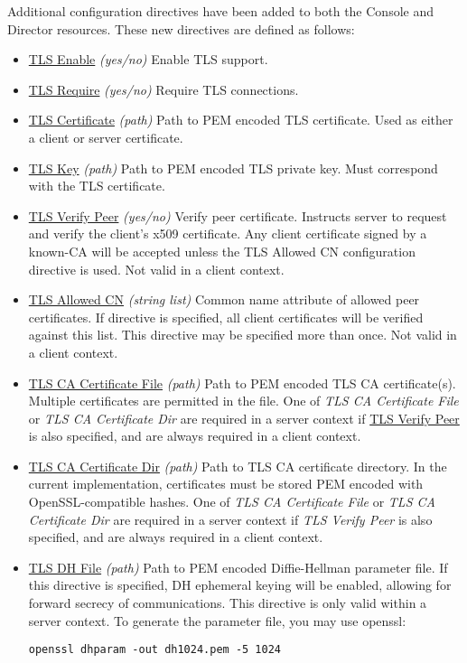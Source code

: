Additional configuration directives have been added to both the Console and
Director resources.  These new directives are defined as follows:

\begin{itemize}
\item \underline{TLS Enable} \emph{(yes/no)}
Enable TLS support.

\item \underline{TLS Require} \emph{(yes/no)}
Require TLS connections.

\item \underline{TLS Certificate} \emph{(path)}
Path to PEM encoded TLS certificate.  Used as either a client or server
certificate.

\item \underline{TLS Key} \emph{(path)}
Path to PEM encoded TLS private key.  Must correspond with the TLS
certificate.

\item \underline{TLS Verify Peer} \emph{(yes/no)}
Verify peer certificate.  Instructs server to request and verify the
client's x509 certificate.  Any client certificate signed by a known-CA
will be accepted unless the TLS Allowed CN configuration directive is used.
Not valid in a client context.

\item \underline{TLS Allowed CN} \emph{(string list)}
Common name attribute of allowed peer certificates.  If directive is
specified, all client certificates will be verified against this list.
This directive may be specified more than once.  Not valid in a client
context.

\item \underline{TLS CA Certificate File} \emph{(path)}
Path to PEM encoded TLS CA certificate(s).  Multiple certificates are
permitted in the file.  One of \emph{TLS CA Certificate File} or \emph{TLS
CA Certificate Dir} are required in a server context if \underline{TLS
Verify Peer} is also specified, and are always required in a client
context.

\item \underline{TLS CA Certificate Dir} \emph{(path)}
Path to TLS CA certificate directory.  In the current implementation,
certificates must be stored PEM encoded with OpenSSL-compatible hashes.
One of \emph{TLS CA Certificate File} or \emph{TLS CA Certificate Dir} are
required in a server context if \emph{TLS Verify Peer} is also specified,
and are always required in a client context.

\item \underline{TLS DH File} \emph{(path)}
Path to PEM encoded Diffie-Hellman parameter file.  If this directive is
specified, DH ephemeral keying will be enabled, allowing for forward
secrecy of communications.  This directive is only valid within a server
context.  To generate the parameter file, you may use openssl:
\footnotesize
\begin{verbatim}
openssl dhparam -out dh1024.pem -5 1024
\end{verbatim}
\normalsize
\end{itemize}

